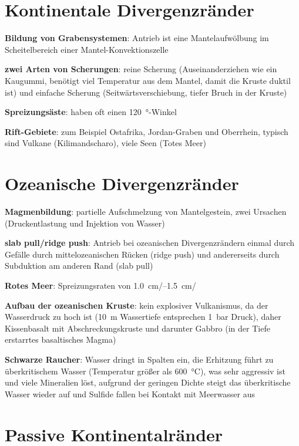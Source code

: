 \section{%
    Kontinentale Divergenzränder%
}

\textbf{Bildung von Grabensystemen}:
Antrieb ist eine Mantelaufwölbung im Scheitelbereich einer Mantel-Konvektionszelle

\textbf{zwei Arten von Scherungen}:
reine Scherung (Auseinanderziehen wie ein Kaugummi, benötigt viel Temperatur aus dem Mantel,
damit die Kruste duktil ist) und
einfache Scherung (Seitwärtsverschiebung, tiefer Bruch in der Kruste)

\textbf{Spreizungsäste}:
haben oft einen \SI{120}{\degree}-Winkel

\textbf{Rift-Gebiete}:
zum Beispiel Ostafrika, Jordan-Graben und Oberrhein,
typisch sind Vulkane (Kilimandscharo), viele Seen (Totes Meer)

\pagebreak

\section{%
    Ozeanische Divergenzränder%
}

\textbf{Magmenbildung}:
partielle Aufschmelzung von Mantelgestein,
zwei Ursachen (Druckentlastung und Injektion von Wasser)

\textbf{slab pull/ridge push}:
Antrieb bei ozeanischen Divergenzrändern einmal durch
Gefälle durch mittelozeanischen Rücken (ridge push) und andererseits durch
Subduktion am anderen Rand (slab pull)

\textbf{Rotes Meer}:
Spreizungsraten von \SIrange{1.0}{1.5}{\centi\meter/\year}

\textbf{Aufbau der ozeanischen Kruste}:
kein explosiver Vulkanismus, da der Wasserdruck zu hoch ist
(\SI{10}{\meter} Wassertiefe entsprechen \SI{1}{\bar} Druck),
daher Kissenbasalt mit Abschreckungskruste
und darunter Gabbro (in der Tiefe erstarrtes basaltisches Magma)

\textbf{Schwarze Raucher}:
Wasser dringt in Spalten ein,
die Erhitzung führt zu überkritischem Wasser (Temperatur größer als \SI{600}{\celsius}),
was sehr aggressiv ist und viele Mineralien löst,
aufgrund der geringen Dichte steigt das überkritische Wasser wieder auf und
Sulfide fallen bei Kontakt mit Meerwasser aus

\section{%
    Passive Kontinentalränder%
}

